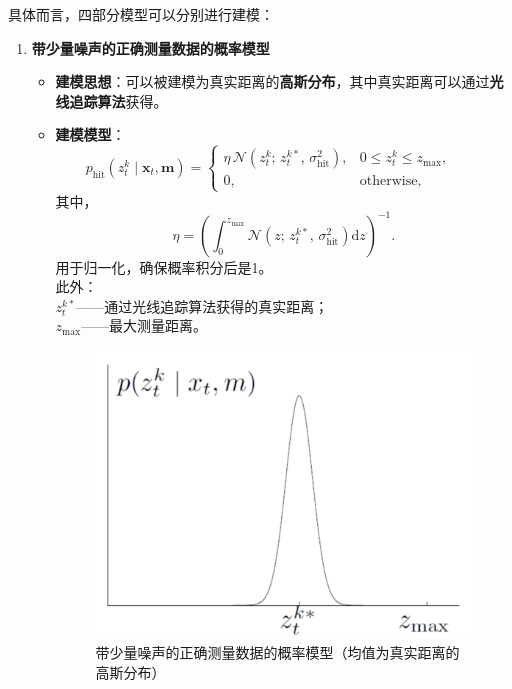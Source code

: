 \documentclass[../main.tex]{subfiles}
\begin{document}
\begin{enumerate}
具体而言，四部分模型可以分别进行建模：
\begin{enumerate}
    \item \textbf{带少量噪声的正确测量数据的概率模型}
    \begin{itemize}
        \item \textbf{建模思想}：可以被建模为真实距离的\textbf{高斯分布}，其中真实距离可以通过\textbf{光线追踪算法}获得。
        \item \textbf{建模模型}：
        \[
        p_{\mathrm{hit}}\!\left(z_t^{k}\mid \mathbf{x}_t,\mathbf{m}\right)=
        \begin{cases}
            \eta\,\mathcal{N}\!\left(z_t^{k};\,z_{t}^{k*},\,\sigma_{\mathrm{hit}}^{2}\right), & 0\le z_t^{k}\le z_{\max},\\[2pt]
            0, & \text{otherwise},
        \end{cases}
        \qquad
        \]
        其中，
        \[\eta=\left(\displaystyle\int_{0}^{z_{\max}}\mathcal{N}\!\left(z;\,z_{t}^{k*},\,\sigma_{\mathrm{hit}}^{2}\right)\mathrm{d}z\right)^{-1}.
        \]
        用于归一化，确保概率积分后是1。\\
        此外：\\
        $z_{t}^{k*}$——通过光线追踪算法获得的真实距离；
        \\$z_{\max}$——最大测量距离。
        \begin{figure}[H]
            \centering
            \includegraphics[width=0.35\linewidth]{images/guance1.png}
            \caption{带少量噪声的正确测量数据的概率模型（均值为真实距离的高斯分布）}
        \end{figure}
    \end{itemize}


\end{enumerate}
\end{enumerate}
\end{document}
